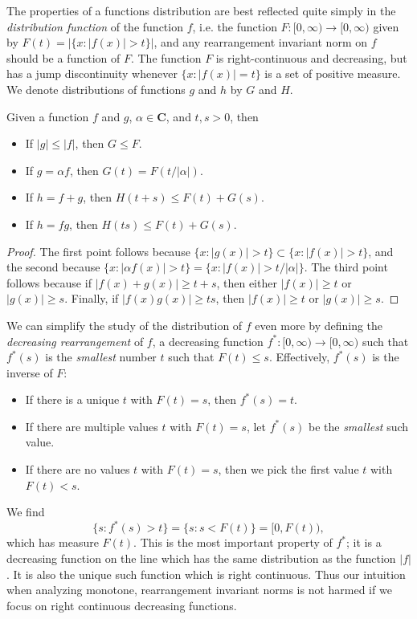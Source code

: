  The properties of a functions distribution are best reflected quite simply in the \emph{distribution function} of the function $f$, i.e. the function $F: [0,\infty) \to [0,\infty)$ given by $F(t) = |\{ x : |f(x)| > t \}|$, and any rearrangement invariant norm on $f$ should be a function of $F$. The function $F$ is right-continuous and decreasing, but has a jump discontinuity whenever $\{ x : |f(x)| = t \}$ is a set of positive measure. We denote distributions of functions $g$ and $h$ by $G$ and $H$.

\begin{lemma}
  Given a function $f$ and $g$, $\alpha \in \mathbf{C}$, and $t,s > 0$, then
  \begin{itemize}
    \item If $|g| \leq |f|$, then $G \leq F$.
    \item If $g = \alpha f$, then $G(t) = F(t/|\alpha|)$.
    \item If $h = f + g$, then $H(t+s) \leq F(t) + G(s)$.
    \item If $h = fg$, then $H(ts) \leq F(t) + G(s)$.
  \end{itemize}
\end{lemma}
\begin{proof}
    The first point follows because $\{ x : |g(x)| > t \} \subset \{ x : |f(x)| > t \}$, and the second because $\{ x : |\alpha f(x)| > t \} = \{ x : |f(x)| > t/|\alpha| \}$. The third point follows because if $|f(x) + g(x)| \geq t + s$, then either $|f(x)| \geq t$ or $|g(x)| \geq s$. Finally, if $|f(x) g(x)| \geq ts$, then $|f(x)| \geq t$ or $|g(x)| \geq s$.
\end{proof}

We can simplify the study of the distribution of $f$ even more by defining the \emph{decreasing rearrangement} of $f$, a decreasing function $f^*: [0,\infty) \to [0,\infty)$ such that $f^*(s)$ is the \emph{smallest} number $t$ such that $F(t) \leq s$. Effectively, $f^*(s)$ is the inverse of $F$:
%
\begin{itemize}
    \item If there is a unique $t$ with $F(t) = s$, then $f^*(s) = t$.
    \item If there are multiple values $t$ with $F(t) = s$, let $f^*(s)$ be the \emph{smallest} such value.
    \item If there are no values $t$ with $F(t) = s$, then we pick the first value $t$ with $F(t) < s$.
\end{itemize}
%
We find
%
\[ \{ s : f^*(s) > t \} = \{ s : s < F(t) \} = [0,F(t)), \]
%
which has measure $F(t)$. This is the most important property of $f^*$; it is a decreasing function on the line which has the same distribution as the function $|f|$. It is also the unique such function which is right continuous. Thus our intuition when analyzing monotone, rearrangement invariant norms is not harmed if we focus on right continuous decreasing functions.

